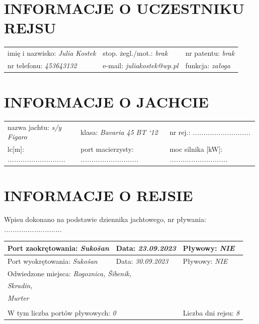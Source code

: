 \documentclass{article}
\begin{document}
\section*{INFORMACJE O UCZESTNIKU REJSU}
\begin{tabularx}{\textwidth}{X X X}
imię i nazwisko: \textit{Julia Kostek} & stop. żegl./mot.: \textit{brak} & nr patentu: \textit{brak} \\
nr telefonu: \textit{453643132} & e-mail: \textit{juliakostek@wp.pl} & funkcja: \textit{załoga} \\
\end{tabularx}

\section*{INFORMACJE O JACHCIE}

\begin{tabularx}{\textwidth}{X X X}
nazwa jachtu: \textit{s/y Figaro} & klasa: \textit{Bavaria 45 BT ‘12} & nr rej.: \textit{...........................} \\
lc[m]: \textit{...........................} & port macierzysty: \textit{...........................} & moc silnika [kW]: \textit{...........................} \\
\end{tabularx}

\section*{INFORMACJE O REJSIE}

Wpisu dokonano na podstawie dziennika jachtowego, nr pływania: \textit{...........................}
\\

\begin{tabularx}{\textwidth}{|X|X|X|}
\hline
Port zaokrętowania: \textit{Sukošan} & Data: \textit{23.09.2023} & Pływowy: \textit{NIE} \\
\hline
Port wyokrętowania: \textit{Sukošan} & Data: \textit{30.09.2023} & Pływowy: \textit{NIE} \\
\hline
\multicolumn{3}{|l|}{Odwiedzone miejsca:
\textit{Rogoznica, Šibenik,}\dotfill}\\
\multicolumn{3}{|l|}{\textit{ Skradin,}\dotfill} \\
\multicolumn{3}{|l|}{\textit{ Murter}\dotfill} \\
\multicolumn{3}{|l|}{\dotfill} \\
\hline
\multicolumn{2}{|l|}{W tym liczba portów pływowych: \textit{0}} & Liczba dni rejsu: \textit{8}\\
\hline
\end{tabularx}
\\\\
\end{document}
